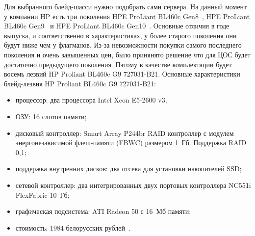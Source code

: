         

        




Для выбранного блейд-шасси нужно подобрать сами сервера. На данный момент у компании HP есть три поколения HPE ProLiant BL460c Gen8~\cite{bl460c-gen8}, HPE ProLiant BL460c Gen9~\cite{bl460c-gen9} и HPE ProLiant BL460c Gen10~\cite{bl460c-gen10}. Основные отличия в годе выпуска, и соответственно в характеристиках, у более старого поколения они будут ниже чем у флагманов. Из-за невозможности покупки самого последнего поколения и очень завышенных цен, было принянято решение что для ЦОС будет достаточно предыдущего поколения. Пэтому в качестве комплектации будет восемь лезвий HP Proliant BL460c G9 727031-B21. Основные характеристики блейд-лезвия HP Proliant BL460c G9 727031-B21:

\begin{itemize}
    \item процессор: два процессора Intel Xeon E5-2600 v3;
    \item ОЗУ: 16 слотов памяти;
    \item дисковый контроллер: Smart Array P244br RAID контроллер с модулем энергонезависимой флеш-памяти (FBWC) размером 1~Гб. Поддержка RAID 0,1;
    \item поддержка внутренних дисков: два отсека для установки накопителей SSD;
    \item сетевой контроллер: два интегрированных двух портовых контроллера NC551i FlexFabric 10~Гб;
    \item графическая подсистема: ATI Radeon 50 с 16~Мб памяти;
    \item стоимость: 1984 белорусских рублей~\cite{bl460c-gen9}.
\end{itemize}

